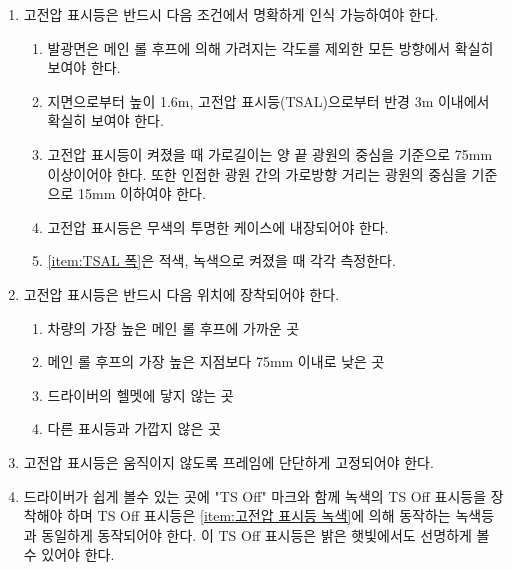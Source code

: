 \documentclass[final,a4paper,10pt]{report}
\begin{document}
\begin{enumerate}
  \item 고전압 표시등은 반드시 다음 조건에서 명확하게 인식 가능하여야 한다.
    \begin{enumerate}
      \item 발광면은 메인 롤 후프에 의해 가려지는 각도를 제외한 모든 방향에서 확실히 보여야 한다.
      \item 지면으로부터 높이 1.6m, 고전압 표시등(TSAL)으로부터 반경 3m 이내에서 확실히 보여야 한다.
      \item 고전압 표시등이 켜졌을 때 가로길이는 양 끝 광원의 중심을 기준으로 75mm 이상이어야 한다. 또한 인접한 광원 간의 가로방향 거리는 광원의 중심을 기준으로 15mm 이하여야 한다. \label{item:TSAL 폭}
      \item 고전압 표시등은 무색의 투명한 케이스에 내장되어야 한다.
      \item \cref{item:TSAL 폭}은 적색, 녹색으로 켜졌을 때 각각 측정한다.
    \end{enumerate}
    
  \item 고전압 표시등은 반드시 다음 위치에 장착되어야 한다.
    \begin{enumerate}
      \item 차량의 가장 높은 메인 롤 후프에 가까운 곳
      \item 메인 롤 후프의 가장 높은 지점보다 75mm 이내로 낮은 곳
      \item 드라이버의 헬멧에 닿지 않는 곳
      \item 다른 표시등과 가깝지 않은 곳
    \end{enumerate}
    
  \item 고전압 표시등은 움직이지 않도록 프레임에 단단하게 고정되어야 한다.
  \item 드라이버가 쉽게 볼수 있는 곳에 "TS Off" 마크와 함께 녹색의 TS Off 표시등을 장착해야 하며 TS Off 표시등은 \cref{item:고전압 표시등 녹색}에 의해 동작하는 녹색등과 동일하게 동작되어야 한다. 이 TS Off 표시등은 밝은 햇빛에서도 선명하게 볼 수 있어야 한다.
\end{enumerate}
\end{document}
